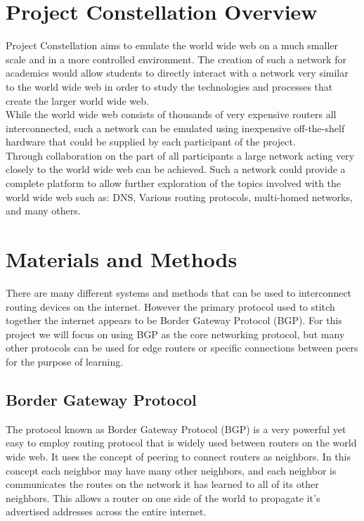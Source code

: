 \documentclass[12pt]{article}
\begin{document}
\clearpage{}

\section{Project Constellation Overview}

Project Constellation aims to emulate the world wide web on a much smaller scale and in a more controlled
environment. The creation of such a network for academics would allow students to directly interact with a 
network very similar to the world wide web in order to study the technologies and processes that create the
larger world wide web.
\\

While the world wide web consists of thousands of very expensive routers all interconnected, such a network
can be emulated using inexpensive off-the-shelf hardware that could be supplied by each participant of the
project.
\\

Through collaboration on the part of all participants a large network acting very closely to the world wide 
web can be achieved. Such a network could provide a complete platform to allow further exploration of the topics
involved with the world wide web such as: DNS, Various routing protocols, multi-homed networks, and many others.


\section{Materials and Methods}

There are many different systems and methods that can be used to interconnect routing devices on the internet. 
However the primary protocol used to stitch together the internet appears to be Border Gateway Protocol (BGP).
For this project we will focus on using BGP as the core networking protocol, but many other protocols can be 
used for edge routers or specific connections between peers for the purpose of learning.


\subsection{Border Gateway Protocol}

The protocol known as Border Gateway Protocol (BGP) is a very powerful yet easy to employ routing protocol that
is widely used between routers on the world wide web. It uses the concept of peering to connect routers as neighbors.
In this concept each neighbor may have many other neighbors, and each neighbor is communicates the routes on the network
it has learned to all of its other neighbors. This allows a router on one side of the world to propagate it's advertised
addresses across the entire internet.
\\
\end{document}
